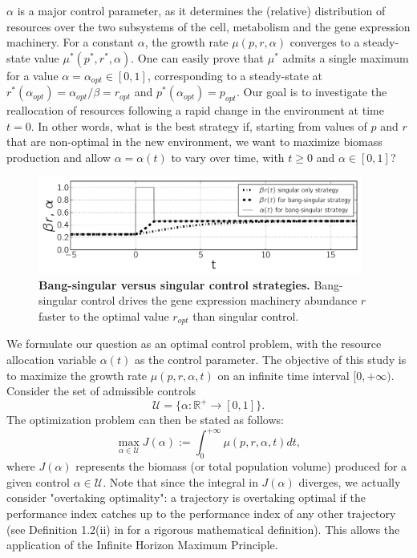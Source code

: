 \documentclass[10pt, conference]{ieeeconf}      %
\begin{document}
$\alpha$ is a major control parameter, as it determines the (relative) distribution of resources over the two subsystems of the cell, metabolism and the gene expression machinery.
For a constant $\alpha$, the growth rate $\mu(p,r,\alpha)$ converges to a steady-state value $\mu^*(p^*, r^*, \alpha)$. 
One can easily prove that $\mu^*$ admits a single maximum for a value $\alpha = \alpha_{opt} \in [0,1]$, corresponding to a steady-state at $r^* (\alpha_{opt}) = \alpha_{opt}/ \beta = r_{opt}$ and $p^* (\alpha_{opt}) = p_{opt}$.
Our goal is to investigate the reallocation of resources following a rapid change in the environment at time $t=0$.
In other words, what is the best strategy if, starting from values of $p$ and $r$ that are non-optimal in the new environment, we want to maximize biomass production and allow $\alpha = \alpha(t)$ to vary over time, with $t\geq 0$ and $\alpha \in [0, 1]$?

\begin{figure}[htpb]
\centering
\includegraphics[trim=0 10 0 10,clip,width=0.95\textwidth]{./Fig/MTNS2014_bangsingularcontrol.pdf}
\caption{\textbf{Bang-singular versus singular control strategies.}
Bang-singular control drives the gene expression machinery abundance $r$ faster to the optimal value $r_{opt}$ than singular control.
}
\label{fig::simul}
\end{figure}

We formulate our question as an optimal control problem, with the resource allocation variable $\alpha(t)$ as the control parameter.
The objective of this study is to maximize the growth rate $\mu(p,r, \alpha, t)$ on an infinite time interval $[0, +\infty)$.
Consider the set of admissible controls
\[
\mathcal{U}=\{\alpha:\mathbb{R}^+ \rightarrow [0,1] \}.
\]
The optimization problem can then be stated as follows:
\begin{equation}\label{Prob}
\max_{\alpha \in \mathcal{U}} J(\alpha):=\int_0^{+\infty} \mu(p, r, \alpha, t) dt,
\end{equation}
where $J(\alpha)$ represents the biomass (or total population volume) produced for a given control $\alpha \in \mathcal{U}$.
Note that since the integral in $J(\alpha)$ diverges, we actually consider "overtaking optimality":
a trajectory is overtaking optimal if the performance index catches up to the performance index of any other trajectory (see Definition 1.2(ii) in \cite{carlson1991} for a rigorous mathematical definition).
This allows the application of the Infinite Horizon Maximum Principle. 
\end{document}
